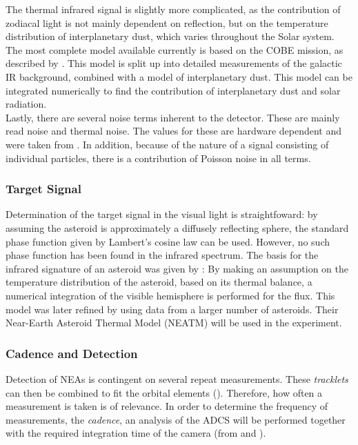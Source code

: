 \documentclass[12pt, english, NoHyper]{AE4010-template}
\begin{document}
The thermal infrared signal is slightly more complicated, as the contribution of zodiacal light is not mainly dependent on reflection, but on the temperature distribution of interplanetary dust, which varies throughout the Solar system. The most complete model available currently is based on the COBE mission, as described by \cite{COBEIRBackground}. This model is split up into detailed measurements of the galactic IR background, combined with a model of interplanetary dust. This model can be integrated numerically to find the contribution of interplanetary dust and solar radiation. \\

Lastly, there are several noise terms inherent to the detector. These are mainly read noise and thermal noise. The values for these are hardware dependent and were taken from \cite{NEOSDT2}. In addition, because of the nature of a signal consisting of individual particles, there is a contribution of Poisson noise in all terms.

\subsubsection{Target Signal}
Determination of the target signal in the visual light is straightfoward: by assuming the asteroid is approximately a diffusely reflecting sphere, the standard phase function given by Lambert's cosine law can be used. However, no such phase function has been found in the infrared spectrum. The basis for the infrared signature of an asteroid was given by \cite{AsteroidSTM}: By making an assumption on the temperature distribution of the asteroid, based on its thermal balance, a numerical integration of the visible hemisphere is performed for the flux. This model was later refined by \cite{AsteroidsInTIR} using data from a larger number of asteroids. Their Near-Earth Asteroid Thermal Model (NEATM) will be used in the experiment.

\subsubsection{Cadence and Detection}
Detection of NEAs is contingent on several repeat measurements. These \textit{tracklets} can then be combined to fit the orbital elements (\cite{OpNav}). Therefore, how often a measurement is taken is of relevance. In order to determine the frequency of measurements, the \textit{cadence}, an analysis of the ADCS will be performed together with the required integration time of the camera (from \cite{NEOSDT2} and \cite{ThesisOlga}). \\
\end{document}
